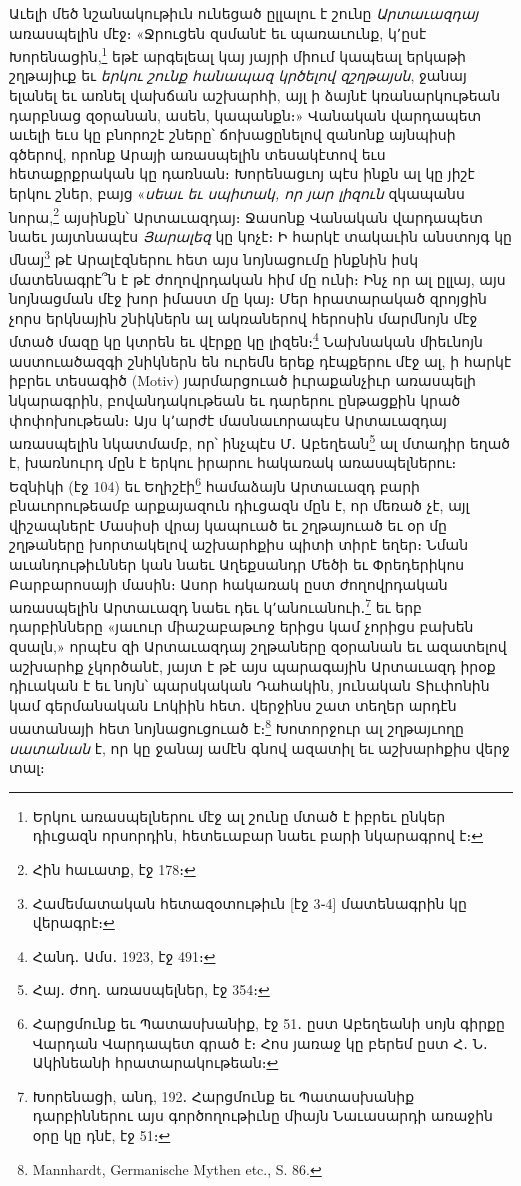 \documentclass{article}
\begin{document}
{Աւելի մեծ նշանակութիւն ունեցած ըլլալու է շունը \emph{Արտաւազդայ} առասպելին մէջ։ «Ջրուցեն զսմանէ եւ պառաւունք, կ՚ըսէ Խորենացին,\footnote{Երկու առասպելներու մէջ ալ շունը մտած է իբրեւ ընկեր դիւցազն որսորդին, հետեւաբար նաեւ բարի նկարագրով է։} եթէ արգելեալ կայ յայրի միում կապեալ երկաթի շղթայիւք եւ \emph{երկու շունք հանապազ կրծելով զշղթայսն}, ջանայ ելանել եւ առնել վախճան աշխարհի, այլ ի ձայնէ կռանարկութեան դարբնաց զօրանան, ասեն, կապանքն։» Վանական վարդապետ աւելի եւս կը բնորոշէ շները՝ ճոխացընելով զանոնք այնպիսի գծերով, որոնք Արայի առասպելին տեսակէտով եւս հետաքրքրական կը դառնան։ Խորենացւոյ պէս ինքն ալ կը յիշէ երկու շներ, բայց «\emph{սեաւ եւ սպիտակ, որ յար լիզուն} զկապանս նորա,\footnote{Հին հաւատք, էջ 178։} այսինքն՝ Արտաւազդայ։ Ջասոնք Վանական վարդապետ նաեւ յայտնապէս \emph{Յարալեզ} կը կոչէ։ Ի հարկէ տակաւին անստոյգ կը մնայ\footnote{Համեմատական հետազօտութիւն [էջ 3֊4] մատենագրին կը վերագրէ։} թէ Արալէզներու հետ այս նոյնացումը ինքնին իսկ մատենագրէ՞ն է թէ ժողովրդական հիմ մը ունի։ Ինչ որ ալ ըլլայ, այս նոյնացման մէջ խոր իմաստ մը կայ։ Մեր հրատարակած զրոյցին չորս երկնային շնիկներն ալ ակռաներով հերոսին մարմնոյն մէջ մտած մազը կը կտրեն եւ վէրքը կը լիզեն։\footnote{Հանդ․ Ամս․ 1923, էջ 491։} Նախնական միեւնոյն աստուածազգի շնիկներն են ուրեմն երեք դէպքերու մէջ ալ, ի հարկէ իբրեւ տեսագիծ (Motiv) յարմարցուած իւրաքանչիւր առասպելի նկարագրին, բովանդակութեան եւ դարերու ընթացքին կրած փոփոխութեան։ Այս կ՚արժէ մասնաւորապէս Արտաւազդայ առասպելին նկատմամբ, որ՝ ինչպէս Մ․ Աբեղեան\footnote{Հայ․ ժող․ առասպելներ, էջ 354։} ալ մտադիր եղած է, խառնուրդ մըն է երկու իրարու հակառակ առասպելներու։ Եզնիկի (էջ 104) եւ Եղիշէի\footnote{Հարցմունք եւ Պատասխանիք, էջ 51․ ըստ Աբեղեանի սոյն գիրքը Վարդան Վարդապետ գրած է։ Հոս յառաջ կը բերեմ ըստ Հ․ Ն․ Ակինեանի հրատարակութեան։} համաձայն Արտաւազդ բարի բնաւորութեամբ արքայազուն դիւցազն մըն է, որ մեռած չէ, այլ վիշապներէ Մասիսի վրայ կապուած եւ շղթայուած եւ օր մը շղթաները խորտակելով աշխարհքիս պիտի տիրէ եղեր։ Նման աւանդութիւններ կան նաեւ Աղեքսանդր Մեծի եւ Փրեդերիկոս Բարբարոսայի մասին։ Ասոր հակառակ ըստ ժողովրդական առասպելին Արտաւազդ նաեւ դեւ կ՚անուանուի․\footnote{Խորենացի, անդ, 192․ Հարցմունք եւ Պատասխանիք դարբիններու այս գործողութիւնը միայն Նաւասարդի առաջին օրը կը դնէ, էջ 51։} եւ երբ դարբինները «յաւուր միաշաբաթւոջ երիցս կամ չորիցս բախեն զսալն,» որպէս զի Արտաւազդայ շղթաները զօրանան եւ ազատելով աշխարհք չկործանէ, յայտ է թէ այս պարագային Արտաւազդ իրօք դիւական է եւ նոյն՝ պարսկական Դահակին, յունական Տիւփոնին կամ գերմանական Լոկիին հետ․ վերջինս շատ տեղեր արդէն սատանայի հետ նոյնացուցուած է։\footnote{Mannhardt, Germanische Mythen etc., S. 86.} Խոտորջուր ալ շղթայւողը \emph{սատանան} է, որ կը ջանայ ամէն գնով ազատիլ եւ աշխարհքիս վերջ տալ։

}
\end{document}
